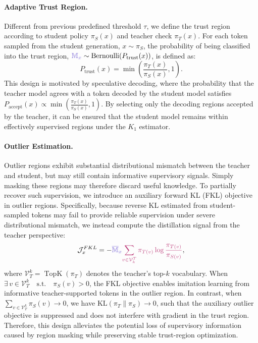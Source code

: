 \documentclass{article} %
\begin{document}
\paragraph{Adaptive Trust Region.}
Different from previous predefined threshold $\tau$, we define the  trust region according to student policy $\pi_S(x)$ and teacher check $\pi_T(x)$.
For each token sampled from the student generation, $x \sim \pi_S$, 
the probability of being classified into the trust region, ${\color{maskpurple}\mathbb{M}_{x}}
\sim
\mathrm{Bernoulli}\!\left(P_{\mathrm{trust}}(x)\right)$, is defined as:
\begin{equation}
P_{\mathrm{trust}}(x)
=
\min\left(
\frac{\pi_T(x)}{\pi_S(x)},
1
\right).
\end{equation}
This design is motivated by speculative decoding, where the probability that the teacher model agrees with a token decoded by the student model satisfies $P_{\mathrm{accept}}(x) \propto \min\left(\frac{\pi_T(x)}{\pi_S(x)}, 1\right)$. By selecting only the decoding regions accepted by the teacher, it can be ensured that the student model remains within effectively supervised regions under the $K_1$ estimator.




\paragraph{Outlier Estimation.}
Outlier regions exhibit substantial distributional mismatch between the teacher and student, but may still contain informative supervisory signals. Simply masking these regions may therefore discard useful knowledge. To partially recover such supervision, we introduce an auxiliary forward KL (FKL) objective in outlier regions. Specifically, because reverse KL estimated from student-sampled tokens may fail to provide reliable supervision under severe distributional mismatch, we instead compute the distillation signal from the teacher perspective:
\begin{equation}
\mathcal{J}_{x}^{FKL}
=
-{\color{maskpurple}\overline{\mathbb{M}}_{x}}
    {\color{reversemagenta}
    \sum_{v \in \mathcal{V}^{T}_{k}}
    \pi_{T(v)}
    \log \frac{\pi_{T(v)}}{\pi_{S(v)}}
    },
\end{equation}
where $\mathcal{V}_{T}^{k}=\operatorname{TopK}(\pi_T)$ denotes the teacher's top-$k$ vocabulary.
When $\exists\, v \in \mathcal{V}_{T}^{k} \quad \text{s.t.} \quad \pi_S(v) > 0$, the FKL objective enables imitation learning from informative teacher-supported tokens in the outlier region. In contrast, when
$\sum_{v \in \mathcal{V}_{T}^{k}} \pi_S(v) \rightarrow 0$,
we have $\mathrm{KL}(\pi_T \parallel \pi_S) \rightarrow 0$, such that the auxiliary outlier objective is suppressed and does not interfere with gradient in the trust region. Therefore, this design alleviates the potential loss of supervisory information caused by region masking while preserving stable trust-region optimization.
\end{document}
